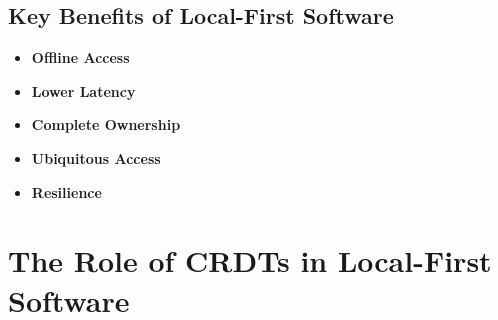\subsection{Key Benefits of Local-First Software}
\begin{itemize}
    \item \textbf{Offline Access}
    \item \textbf{Lower Latency}
    \item \textbf{Complete Ownership}
    \item \textbf{Ubiquitous Access}
    \item \textbf{Resilience}
\end{itemize}

\section{The Role of CRDTs in Local-First Software}
